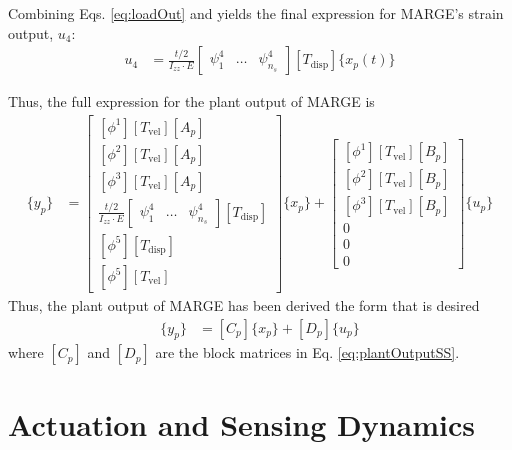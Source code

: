 Combining Eqs. \ref{eq:loadOut} and \label{eq:beamTheory} yields the final expression for MARGE's strain output, $u_4$:
\begin{align}
	u_4 &= \frac{t/2}{I_{zz} \cdot E} \begin{bmatrix} \psi_1^4 & \dots & \psi_{n_s}^4 \end{bmatrix} [T_\text{disp}] \{x_p(t)\}
\end{align}

Thus, the full expression for the plant output of MARGE is
\begin{align}
	\label{eq:plantOutputSS}
	\{y_p\} &= \begin{bmatrix}
		\left[ \phi^1 \right] [T_\text{vel}] [A_p] \\
		\left[ \phi^2 \right] [T_\text{vel}] [A_p] \\
		\left[ \phi^3 \right] [T_\text{vel}] [A_p] \\
		\frac{t/2}{I_{zz} \cdot E} \begin{bmatrix} \psi_1^4 & \dots & \psi_{n_s}^4 \end{bmatrix} [T_\text{disp}] \\
		\left[ \phi^5 \right] [T_\text{disp}] \\
		\left[ \phi^5 \right] [T_\text{vel}]
	\end{bmatrix} \{x_p\} + \begin{bmatrix}
		\left[ \phi^1 \right] [T_\text{vel}] [B_p] \\
		\left[ \phi^2 \right] [T_\text{vel}] [B_p] \\
		\left[ \phi^3 \right] [T_\text{vel}] [B_p] \\
		0 \\ 0 \\ 0
	\end{bmatrix}  \{u_p\}
\end{align}
Thus, the plant output of MARGE has been derived the form that is desired
\begin{align}
	\{y_p\} &= [C_p] \{x_p\} + [D_p] \{u_p\}
\end{align}
where $[C_p]$ and $[D_p]$ are the block matrices in Eq. \ref{eq:plantOutputSS}.

\section{Actuation and Sensing Dynamics}

